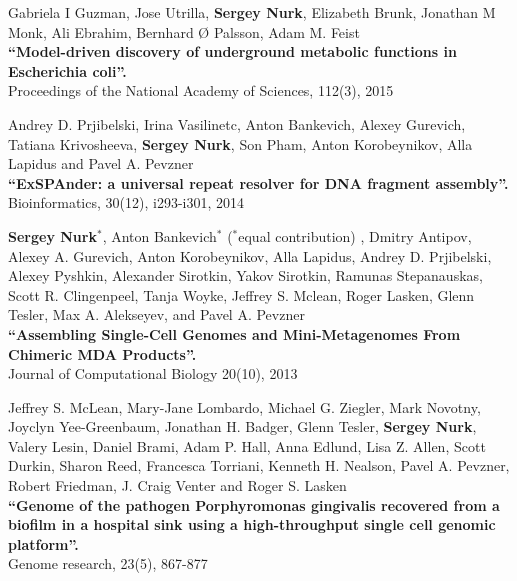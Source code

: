 \begin{outerlist}
\item Gabriela I Guzman, Jose Utrilla, \textbf{Sergey Nurk}, Elizabeth Brunk, Jonathan M Monk, Ali Ebrahim, Bernhard Ø Palsson, Adam M. Feist\\
\textbf{``Model-driven discovery of underground metabolic functions in Escherichia coli''.} \\
Proceedings of the National Academy of Sciences, 112(3), 2015

\item Andrey D. Prjibelski, Irina Vasilinetc, Anton Bankevich, Alexey Gurevich, Tatiana Krivosheeva, \textbf{Sergey Nurk}, Son Pham, Anton Korobeynikov, Alla Lapidus and Pavel A. Pevzner\\
\textbf{``ExSPAnder: a universal repeat resolver for DNA fragment assembly''.} \\
Bioinformatics, 30(12), i293-i301, 2014

\item \textbf{Sergey Nurk}$^*$, Anton Bankevich$^*$ ($^*$equal contribution)%
, Dmitry Antipov, Alexey A. Gurevich, Anton Korobeynikov, Alla Lapidus, Andrey D. Prjibelski, Alexey Pyshkin, Alexander Sirotkin, Yakov Sirotkin, Ramunas Stepanauskas, Scott R. Clingenpeel, Tanja Woyke, Jeffrey S. Mclean, Roger Lasken, Glenn Tesler, Max A. Alekseyev, and Pavel A. Pevzner \\
\textbf{``Assembling Single-Cell Genomes and Mini-Metagenomes From Chimeric MDA Products''.} \\
Journal of Computational Biology 20(10), 2013


\item Jeffrey S. McLean, Mary-Jane Lombardo, Michael G. Ziegler, Mark Novotny, Joyclyn Yee-Greenbaum, Jonathan H. Badger, Glenn Tesler, \textbf{Sergey Nurk}, Valery Lesin, Daniel Brami, Adam P. Hall, Anna Edlund, Lisa Z. Allen, Scott Durkin, Sharon Reed, Francesca Torriani, Kenneth H. Nealson, Pavel A. Pevzner, Robert Friedman, J. Craig Venter and Roger S. Lasken \\
\textbf{``Genome of the pathogen Porphyromonas gingivalis recovered from a biofilm in a hospital sink using a high-throughput single cell genomic platform''.} \\
Genome research, 23(5), 867-877


\end{outerlist}
